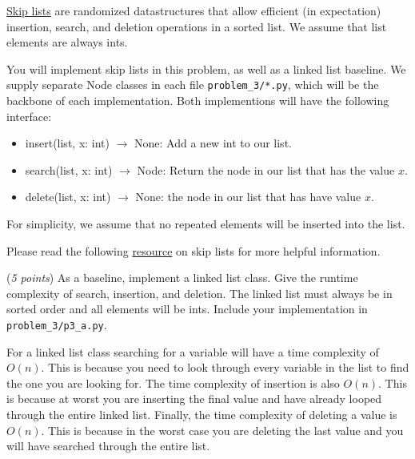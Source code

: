 \documentclass{hw}
\begin{document}
\begin{problem}
\href{https://en.wikipedia.org/wiki/Skip_list}{Skip lists}
are randomized datastructures that allow efficient (in expectation)
insertion, search, and deletion operations in a sorted list.
We assume that list elements are always ints.

You will implement skip lists in this problem, as well as a linked list baseline.
We supply separate Node classes in each file \texttt{problem\_3/*.py}, which will be the backbone of each implementation.
Both implementions will have the following interface:
\begin{itemize}
\item insert(list, x: int) $\rightarrow$ None: Add a new int to our list.
\item search(list, x: int) $\rightarrow$ Node: Return the node in our list that has the value $x$.
\item delete(list, x: int) $\rightarrow$ None: the node in our list that has have value $x$.
\end{itemize}
For simplicity, we assume that no repeated elements will be inserted into the list.

Please read the following
\href{https://ocw.mit.edu/courses/6-046j-introduction-to-algorithms-sma-5503-fall-2005/resources/l12_skiplists/}{resource}
on skip lists for more helpful information.

\begin{subproblem}
(\textit{5 points}) As a baseline, implement a linked list class.
Give the runtime complexity of search, insertion, and deletion.
The linked list must always be in sorted order and all elements will be ints.
Include your implementation in \texttt{problem\_3/p3\_a.py}.
\end{subproblem}
\begin{solution}
For a linked list class searching for a variable will have a time complexity of $O(n)$. This is because you need to look through every variable in the list to find the one you are looking for. The time complexity of insertion is also $O(n)$. This is because at worst you are inserting the final value and have already looped through the entire linked list. Finally, the time complexity of deleting a value is $O(n)$. This is because in the worst case you are deleting the last value and you will have searched through the entire list.
\end{solution}



\end{problem}
\end{document}
